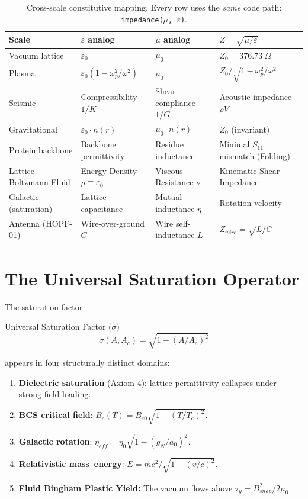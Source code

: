 \begin{table}[H]
\centering\small
\caption{Cross-scale constitutive mapping.  Every row uses the
\textit{same} code path: \texttt{impedance($\mu$, $\varepsilon$)}.}
\label{tab:cross_scale}
\begin{tabular}{llll}
\toprule
\textbf{Scale} & \textbf{$\varepsilon$ analog}
  & \textbf{$\mu$ analog}
  & \textbf{$Z = \sqrt{\mu/\varepsilon}$} \\
\midrule
Vacuum lattice
  & $\varepsilon_0$
  & $\mu_0$
  & $Z_0 = 376.73\;\Omega$ \\
Plasma
  & $\varepsilon_0(1 - \omega_p^2/\omega^2)$
  & $\mu_0$
  & $Z_0/\sqrt{1-\omega_p^2/\omega^2}$ \\
Seismic
  & Compressibility $1/K$
  & Shear compliance $1/G$
  & Acoustic impedance $\rho V$ \\
Gravitational
  & $\varepsilon_0 \cdot n(r)$
  & $\mu_0 \cdot n(r)$
  & $Z_0$ (invariant) \\
Protein backbone
  & Backbone permittivity
  & Residue inductance
  & Minimal $S_{11}$ mismatch (Folding) \\
Lattice Boltzmann Fluid
  & Energy Density $\rho \equiv \varepsilon_0$
  & Viscous Resistance $\nu$
  & Kinematic Shear Impedance \\
Galactic (saturation)
  & Lattice capacitance
  & Mutual inductance $\eta$
  & Rotation velocity \\
Antenna (HOPF-01)
  & Wire-over-ground $C$
  & Wire self-inductance $L$
  & $Z_{wire} = \sqrt{L/C}$ \\
\bottomrule
\end{tabular}
\end{table}


\section{The Universal Saturation Operator}
\label{sec:universal_saturation}

The saturation factor
\begin{resultbox}{Universal Saturation Factor ($\sigma$)}
\begin{equation}
    \sigma(A, A_c) = \sqrt{1 - (A/A_c)^2}
    \label{eq:saturation_sigma}
\end{equation}
\end{resultbox}
appears in four structurally distinct domains:

\begin{enumerate}
    \item \textbf{Dielectric saturation} (Axiom 4): lattice permittivity
          collapses under strong-field loading.
    \item \textbf{BCS critical field}: $B_c(T) = B_{c0}\sqrt{1-(T/T_c)^2}$.
    \item \textbf{Galactic rotation}: $\eta_{eff} = \eta_0\sqrt{1-(g_N/a_0)^2}$.
    \item \textbf{Relativistic mass--energy}: $E = mc^2/\sqrt{1-(v/c)^2}$.
    \item \textbf{Fluid Bingham Plastic Yield:} The vacuum flows above $\tau_y = B_{snap}^2/2\mu_0$.
\end{enumerate}

